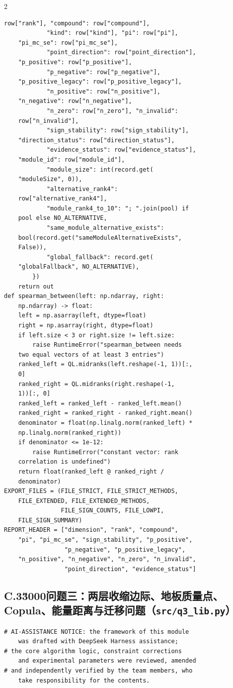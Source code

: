 \begin{multicols}{2}
\begin{Verbatim}[fontsize=\scriptsize]
    row["rank"], "compound": row["compound"],
            "kind": row["kind"], "pi": row["pi"],
    "pi_mc_se": row["pi_mc_se"],
            "point_direction": row["point_direction"],
    "p_positive": row["p_positive"],
            "p_negative": row["p_negative"],
    "p_positive_legacy": row["p_positive_legacy"],
            "n_positive": row["n_positive"],
    "n_negative": row["n_negative"],
            "n_zero": row["n_zero"], "n_invalid":
    row["n_invalid"],
            "sign_stability": row["sign_stability"],
    "direction_status": row["direction_status"],
            "evidence_status": row["evidence_status"],
    "module_id": row["module_id"],
            "module_size": int(record.get(
    "moduleSize", 0)),
            "alternative_rank4":
    row["alternative_rank4"],
            "module_rank4_to_10": "; ".join(pool) if
    pool else NO_ALTERNATIVE,
            "same_module_alternative_exists":
    bool(record.get("sameModuleAlternativeExists",
    False)),
            "global_fallback": record.get(
    "globalFallback", NO_ALTERNATIVE),
        })
    return out
def spearman_between(left: np.ndarray, right:
    np.ndarray) -> float:
    left = np.asarray(left, dtype=float)
    right = np.asarray(right, dtype=float)
    if left.size < 3 or right.size != left.size:
        raise RuntimeError("spearman_between needs
    two equal vectors of at least 3 entries")
    ranked_left = QL.midranks(left.reshape(-1, 1))[:,
    0]
    ranked_right = QL.midranks(right.reshape(-1,
    1))[:, 0]
    ranked_left = ranked_left - ranked_left.mean()
    ranked_right = ranked_right - ranked_right.mean()
    denominator = float(np.linalg.norm(ranked_left) *
    np.linalg.norm(ranked_right))
    if denominator <= 1e-12:
        raise RuntimeError("constant vector: rank
    correlation is undefined")
    return float(ranked_left @ ranked_right /
    denominator)
EXPORT_FILES = (FILE_STRICT, FILE_STRICT_METHODS,
    FILE_EXTENDED, FILE_EXTENDED_METHODS,
                FILE_SIGN_COUNTS, FILE_LOWPI,
    FILE_SIGN_SUMMARY)
REPORT_HEADER = ["dimension", "rank", "compound",
    "pi", "pi_mc_se", "sign_stability", "p_positive",
                 "p_negative", "p_positive_legacy",
    "n_positive", "n_negative", "n_zero", "n_invalid",
                 "point_direction", "evidence_status"]
\end{Verbatim}

\subsection*{C.3\u3000问题三：两层收缩边际、地板质量点、Copula、能量距离与迁移问题（\texttt{src/q3\_lib.py}）}
\begin{Verbatim}[fontsize=\scriptsize]
# AI-ASSISTANCE NOTICE: the framework of this module
    was drafted with DeepSeek Harness assistance;
# the core algorithm logic, constraint corrections
    and experimental parameters were reviewed, amended
# and independently verified by the team members, who
    take responsibility for the contents.


\end{Verbatim}
\end{multicols}
